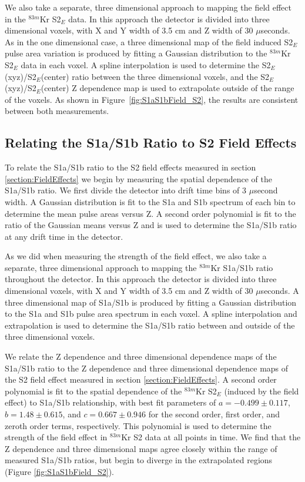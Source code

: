 We also take a separate, three dimensional approach to mapping the field effect in the $^{83m}$Kr S2$_E$ data. In this approach the detector is divided into three dimensional voxels, with X and Y width of 3.5 cm and Z width of 30 $\mu$seconds.  As in the one dimensional case, a three dimensional map of the field induced S2$_E$ pulse area variation is produced by fitting a Gaussian distribution to the $^{83m}$Kr S2$_E$ data in each voxel.  A spline interpolation is used to determine the S2$_E$(xyz)/S2$_E$(center) ratio between the three dimensional voxels, and the S2$_E$(xyz)/S2$_E$(center) Z dependence map is used to extrapolate outside of the range of the voxels.  As shown in Figure~\ref{fig:S1aS1bField_S2}, the results are consistent between both measurements.
\subsection{Relating the S1a/S1b Ratio to S2 Field Effects} \label{section:S1aS1b2}

To relate the S1a/S1b ratio to the S2 field effects measured in section \ref{section:FieldEffects} we begin by measuring the spatial dependence of the S1a/S1b ratio.  We first divide the detector into drift time bins of 3 $\mu$second width.   A Gaussian distribution is fit to the S1a and S1b spectrum of each bin to determine the mean pulse areas versus Z.   A second order polynomial is fit to the ratio of the Gaussian means versus Z and is used to determine the S1a/S1b ratio at any drift time in the detector.  

As we did when measuring the strength of the field effect, we also take a separate, three dimensional approach to mapping the $^{83m}$Kr S1a/S1b ratio throughout the detector. In this approach the detector is divided into three dimensional voxels, with X and Y width of 3.5 cm and Z width of 30 $\mu$seconds.  A three dimensional map of S1a/S1b is produced by fitting a Gaussian distribution to the S1a and S1b pulse area spectrum in each voxel.  A spline interpolation and extrapolation is used to determine the S1a/S1b ratio between and outside of the three dimensional voxels.

We relate the Z dependence and three dimensional dependence maps of the S1a/S1b ratio to the Z dependence and three dimensional dependence maps of the S2 field effect measured in section \ref{section:FieldEffects}.  A second order polynomial is fit to the spatial dependence of the $^{83m}$Kr S2$_E$ (induced by the field effect) to S1a/S1b relationship, with best fit parameters of $a=-0.499 \pm 0.117$,$b=1.48 \pm 0.615$, and $c=0.667 \pm 0.946$ for the second order, first order, and zeroth order terms, respectively. This polynomial is used to determine the strength of the field effect in $^{83m}$Kr S2 data at all points in time.  We find that the Z dependence and three dimensional maps agree closely within the range of measured S1a/S1b ratios, but begin to diverge in the extrapolated regions (Figure \ref{fig:S1aS1bField_S2}). 

